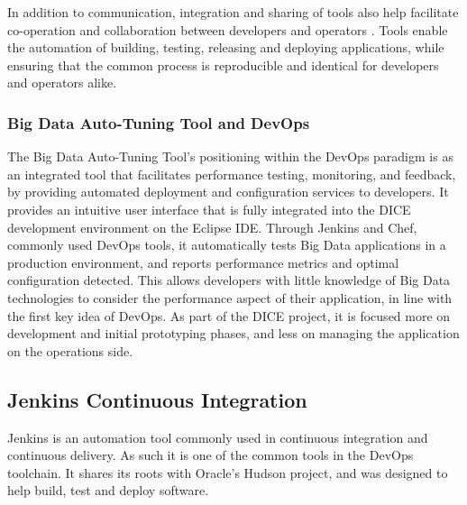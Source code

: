 In addition to communication, integration and sharing of tools also help facilitate co-operation and collaboration between developers and operators \cite{f}. Tools enable the automation of building, testing, releasing and deploying applications, while ensuring that the common process is reproducible and identical for developers and operators alike. 

\subsubsection{Big Data Auto-Tuning Tool and DevOps}
The Big Data Auto-Tuning Tool's positioning within the DevOps paradigm is as an integrated tool that facilitates performance testing, monitoring, and feedback, by providing automated deployment and configuration services to developers. It provides an intuitive user interface that is fully integrated into the DICE development environment on the Eclipse IDE. Through Jenkins and Chef, commonly used DevOps tools, it automatically tests Big Data applications in a production environment, and reports performance metrics and optimal configuration detected. This allows developers with little knowledge of Big Data technologies to consider the performance aspect of their application, in line with the first key idea of DevOps. As part of the DICE project, it is focused more on development and initial prototyping phases, and less on managing the application on the operations side.

\newpage
\subsection{Jenkins Continuous Integration}
Jenkins is an automation tool commonly used in continuous integration and continuous delivery. As such it is one of the common tools in the DevOps toolchain. It shares its roots with Oracle's Hudson project, \cite{hudson} and was designed to help build, test and deploy software. 

